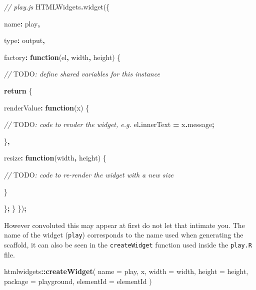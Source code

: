 \documentclass[
]{krantz}
\makeatletter
\newenvironment{Shaded}{\begin{snugshade}}{\end{snugshade}}
\newcommand{\AlertTok}[1]{\textcolor[rgb]{0.33,0.33,0.33}{#1}}
\newcommand{\AttributeTok}[1]{\textcolor[rgb]{0.61,0.61,0.61}{#1}}
\newcommand{\CommentTok}[1]{\textcolor[rgb]{0.37,0.37,0.37}{\textit{#1}}}
\newcommand{\ControlFlowTok}[1]{\textcolor[rgb]{0.27,0.27,0.27}{\textbf{#1}}}
\newcommand{\DataTypeTok}[1]{\textcolor[rgb]{0.27,0.27,0.27}{#1}}
\newcommand{\FunctionTok}[1]{\textcolor[rgb]{0,0,0}{#1}}
\newcommand{\KeywordTok}[1]{\textcolor[rgb]{0.27,0.27,0.27}{\textbf{#1}}}
\newcommand{\NormalTok}[1]{#1}
\newcommand{\OperatorTok}[1]{\textcolor[rgb]{0.43,0.43,0.43}{\textbf{#1}}}
\newcommand{\StringTok}[1]{\textcolor[rgb]{0.5,0.5,0.5}{#1}}
\newenvironment{kframe}{%
\medskip{}
\setlength{\fboxsep}{.8em}
 \def\at@end@of@kframe{}%
 \ifinner\ifhmode%
  \def\at@end@of@kframe{\end{minipage}}%
  \begin{minipage}{\columnwidth}%
 \fi\fi%
 \def\FrameCommand##1{\hskip\@totalleftmargin \hskip-\fboxsep
 \colorbox{shadecolor}{##1}\hskip-\fboxsep
     \hskip-\linewidth \hskip-\@totalleftmargin \hskip\columnwidth}%
 \MakeFramed {\advance\hsize-\width
   \@totalleftmargin\z@ \linewidth\hsize
   \@setminipage}}%
 {\par\unskip\endMakeFramed%
 \at@end@of@kframe}
\renewenvironment{Shaded}{\begin{kframe}}{\end{kframe}}
\makeatother
\begin{document}
\begin{Shaded}
\begin{Highlighting}[]
\CommentTok{// play.js}
\NormalTok{HTMLWidgets}\OperatorTok{.}\FunctionTok{widget}\NormalTok{(\{}

  \DataTypeTok{name}\OperatorTok{:} \StringTok{\textquotesingle{}play\textquotesingle{}}\OperatorTok{,}

  \DataTypeTok{type}\OperatorTok{:} \StringTok{\textquotesingle{}output\textquotesingle{}}\OperatorTok{,}

  \DataTypeTok{factory}\OperatorTok{:} \KeywordTok{function}\NormalTok{(el}\OperatorTok{,}\NormalTok{ width}\OperatorTok{,}\NormalTok{ height) \{}

    \CommentTok{// }\AlertTok{TODO}\CommentTok{: define shared variables for this instance}

    \ControlFlowTok{return}\NormalTok{ \{}

      \DataTypeTok{renderValue}\OperatorTok{:} \KeywordTok{function}\NormalTok{(x) \{}

        \CommentTok{// }\AlertTok{TODO}\CommentTok{: code to render the widget, e.g.}
\NormalTok{        el}\OperatorTok{.}\AttributeTok{innerText} \OperatorTok{=}\NormalTok{ x}\OperatorTok{.}\AttributeTok{message}\OperatorTok{;}

\NormalTok{      \}}\OperatorTok{,}

      \DataTypeTok{resize}\OperatorTok{:} \KeywordTok{function}\NormalTok{(width}\OperatorTok{,}\NormalTok{ height) \{}

        \CommentTok{// }\AlertTok{TODO}\CommentTok{: code to re{-}render the widget with a new size}

\NormalTok{      \}}

\NormalTok{    \}}\OperatorTok{;}
\NormalTok{  \}}
\NormalTok{\})}\OperatorTok{;}
\end{Highlighting}
\end{Shaded}

However convoluted this may appear at first do not let that intimate you. The name of the widget (\texttt{play}) corresponds to the name used when generating the scaffold, it can also be seen in the \texttt{createWidget} function used inside the \texttt{play.R} file.

\begin{Shaded}
\begin{Highlighting}[]
\NormalTok{htmlwidgets}\OperatorTok{::}\KeywordTok{createWidget}\NormalTok{(}
  \DataTypeTok{name =} \StringTok{\textquotesingle{}play\textquotesingle{}}\NormalTok{,}
\NormalTok{  x,}
  \DataTypeTok{width =}\NormalTok{ width,}
  \DataTypeTok{height =}\NormalTok{ height,}
  \DataTypeTok{package =} \StringTok{\textquotesingle{}playground\textquotesingle{}}\NormalTok{,}
  \DataTypeTok{elementId =}\NormalTok{ elementId}
\NormalTok{)}
\end{Highlighting}
\end{Shaded}
\end{document}
